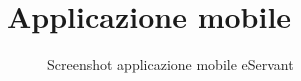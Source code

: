 \chapter{Applicazione mobile}

\begin{figure}[htp]
    \centering  
    \caption{Screenshot applicazione mobile eServant}

\end{figure}
